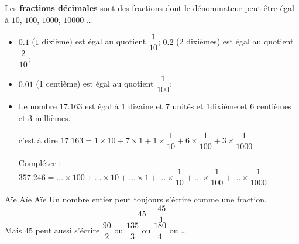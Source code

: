 \begin{definition}
    Les {\bfseries fractions décimales} sont des fractions dont le dénominateur peut être égal à $10$, $100$, $\num{1000}$, $\num{10 000}$ \dots
\end{definition}

\begin{exemples*1}
    \vspace*{2mm}
    \begin{itemize}
        \item $\num{0.1}$ ($1$ dixième) est égal au quotient $\dfrac{1}{10}$; $\num{0.2}$ (2 dixièmes) est égal au quotient $\dfrac{2}{10}$;
        \item $\num{0.01}$ (1 centième) est égal au quotient $\dfrac{1}{100}$; \vspace*{2mm}
        \item Le nombre $\num{17.163}$ est égal à 1 dizaine et 7 unités et 1dixième et 6 centièmes et 3 millièmes.
        \par\vspace*{2mm}
        c'est à dire $\num{17.163}=1\times 10+7\times 1+1\times \dfrac{1}{10}+6\times \dfrac{1}{100} + 3\times \dfrac{1}{\num{1000}}$
        \par
        Compléter : $\num{357.246}=\ldots \times 100+\ldots \times 10+\ldots \times 1+\ldots \times \dfrac{1}{10}+\ldots \times \dfrac{1}{100} + \ldots \times \dfrac{1}{\num{1000}}$
    \end{itemize}
\end{exemples*1}

\begin{myBox}{ Aïe Aïe Aïe}
    Un nombre entier peut toujours s'écrire comme une fraction.
    $$45=\dfrac{45}1$$
    Mais $45$ peut aussi s'écrire $\dfrac{90}{2}$ ou $\dfrac{135}{3}$ ou $\dfrac{180}{4}$ ou \ldots
\end{myBox}
